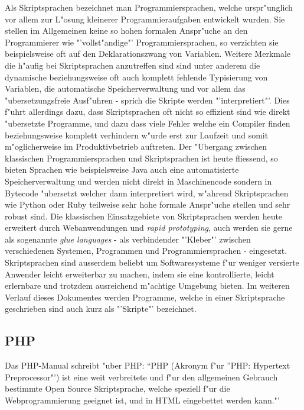 Als Skriptsprachen bezeichnet man Programmiersprachen, welche urspr"unglich vor allem zur L"osung
kleinerer Programmieraufgaben entwickelt wurden. Sie stellen im Allgemeinen keine so hohen formalen 
Anspr"uche an den Programmierer wie "'vollst"andige"' Programmiersprachen, so verzichten sie
beispielsweise oft auf den Deklarationszwang von Variablen. Weitere Merkmale die h"aufig bei
Skriptsprachen anzutreffen sind sind unter anderem die dynamische beziehungsweise oft auch komplett 
fehlende Typisierung von Variablen, die automatische Speicherverwaltung und vor allem das
"ubersetzungsfreie Ausf"uhren - sprich die Skripte werden "'interpretiert"'. Dies f"uhrt allerdings
dazu, dass Skriptsprachen oft nicht so effizient sind wie direkt "ubersetzte Programme, und dazu
dass viele Fehler welche ein Compiler finden beziehungsweise komplett verhindern w"urde erst zur
Laufzeit und somit m"oglicherweise im Produktivbetrieb auftreten.
Der "Ubergang zwischen klassischen Programmiersprachen und Skriptsprachen ist heute fliessend, so 
bieten Sprachen wie beispielsweise Java auch eine automatisierte Speicherverwaltung und werden nicht
direkt in Maschinencode sondern in Bytecode "ubersetzt welcher dann interpretiert wird, w"ahrend 
Skriptsprachen wie Python oder Ruby teilweise sehr hohe formale Anspr"uche stellen und sehr robust sind.
Die klassischen Einsatzgebiete von Skriptsprachen werden heute erweitert durch Webanwendungen und
\emph{rapid prototyping}, auch werden sie gerne als sogenannte \emph{glue languages} - als 
verbindender "'Kleber"' zwischen verschiedenen Systemen, Programmen und Programmiersprachen -
eingesetzt. Skriptsprachen sind ausserdem beliebt um Softwaresysteme f"ur weniger versierte Anwender
leicht erweiterbar zu machen, indem sie eine kontrollierte, leicht erlernbare und trotzdem 
ausreichend m"achtige Umgebung bieten.
Im weiteren Verlauf dieses Dokumentes werden Programme, welche in einer Skriptsprache geschrieben sind 
auch kurz als "'Skripte"' bezeichnet.

\subsection{PHP}
\label{sec:background:php}

Das PHP-Manual \cite{PHPMAN} schreibt "uber PHP: "`PHP (Akronym f"ur "'PHP: Hypertext Preprocessor"') 
ist eine weit verbreitete und f"ur den allgemeinen Gebrauch bestimmte Open Source Skriptsprache, 
welche speziell f"ur die Webprogrammierung geeignet ist, und in HTML eingebettet werden kann."'


